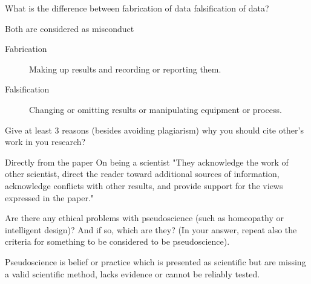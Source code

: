 \documentclass[a4paper,twoside=false,abstract=false,numbers=noenddot,
titlepage=false,headings=small,parskip=half,version=last]{scrartcl}
\begin{document}

\begin{exercise}{1}
    What is the difference between fabrication of data falsification of data?
\end{exercise}
\begin{solution} Both are considered as misconduct \\
    \begin{description}
       \item[Fabrication] Making up results and recording or reporting them. \\
       \item[Falsification] Changing or omitting results or manipulating
       equipment or process. \\
    \end{description}
\end{solution}
\begin{exercise}{2}
    Give at least 3 reasons (besides avoiding plagiarism) why you should cite
    other's work in you research?
\end{exercise}
\begin{solution}
    Directly from the paper On being a scientist "They acknowledge the work of
    other scientist, direct the reader toward additional sources of
    information, acknowledge conflicts with other results, and provide support
    for the views expressed in the paper."
\end{solution}
\begin{exercise}{3}
    Are there any ethical problems with pseudoscience (such as homeopathy or
    intelligent design)? And if so, which are they? (In your answer, repeat
    also the criteria for something to be considered to be pseudoscience).
\end{exercise}
\begin{solution}
    Pseudoscience is belief or practice which is presented as scientific but
    are missing a valid scientific method, lacks evidence or cannot be reliably
    tested. 
\end{solution}
\end{document}
